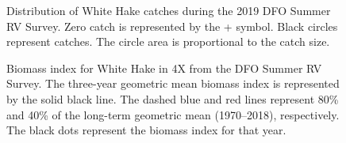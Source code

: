 \documentclass[11pt]{book}
\begin{document}
\begin{figure}[htb]

{\centering {} 

}

\caption{Distribution of White Hake catches during the 2019 DFO Summer RV Survey. Zero catch is represented by the + symbol. Black circles represent catches. The circle area is proportional to the catch size.}\label{fig:19-map-whitehake}
\end{figure}

\begin{figure}[htb]

{\centering {} 

}

\caption{Biomass index for White Hake in 4X from the DFO Summer RV Survey. The three-year geometric mean biomass index is represented by the solid black line. The dashed blue and red lines represent 80\% and 40\% of the long-term geometric mean (1970--2018), respectively. The black dots represent the biomass index for that year.}\label{fig:20-fig-whitehake-biomass4X}
\end{figure}
\end{document}
